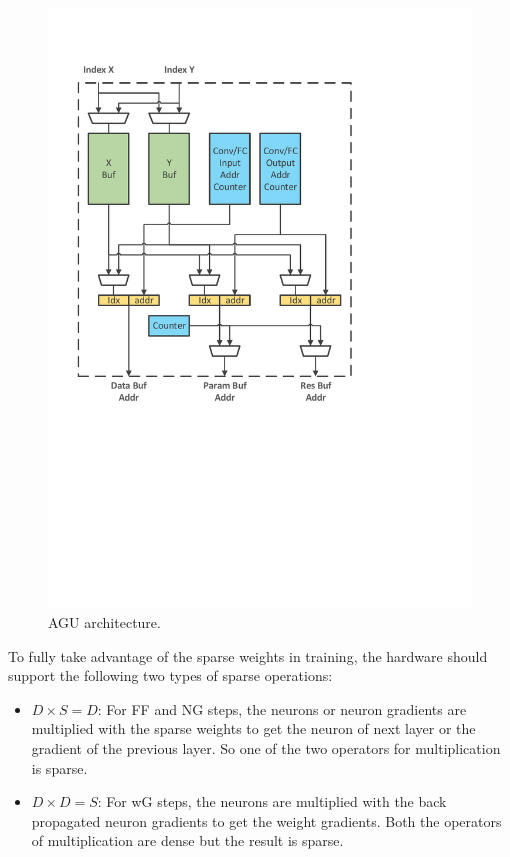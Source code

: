 \begin{figure}[htb]
  \centering
  \includegraphics[width=1.0\columnwidth]{figures/agu.pdf}
  \caption{AGU architecture.}
  \label{fig:agu}
\end{figure}

To fully take advantage of the sparse weights in training, the hardware should support the following two types of sparse operations:
\begin{itemize}
\item $D\times S=D$: For FF and NG steps, the neurons or neuron gradients are multiplied with the sparse weights to get the neuron of next layer or the gradient of the previous layer. So one of the two operators for multiplication is sparse.
\item $D\times D=S$: For wG steps, the neurons are multiplied with the back propagated neuron gradients to get the weight gradients. Both the operators of multiplication are dense but the result is sparse.
\end{itemize}

